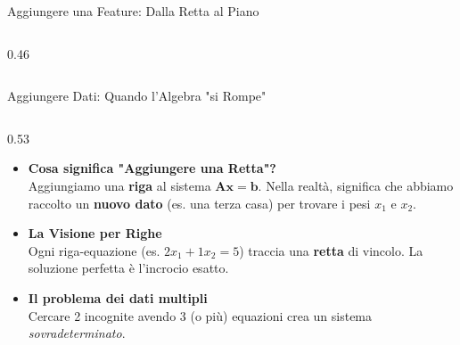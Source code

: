 \documentclass[aspectratio=169, 10pt]{beamer}
\begin{document}
\begin{frame}{Aggiungere una Feature: Dalla Retta al Piano}
\begin{columns}[T,onlytextwidth]
\begin{column}{0.46\textwidth}
        \end{column}
    \end{columns}
\end{frame}


\begin{frame}{Aggiungere Dati: Quando l'Algebra "si Rompe"}
    \begin{columns}[T,onlytextwidth]
        \setlength{\columnsep}{0.15cm}
        
        \begin{column}{0.53\textwidth}
            \vspace{-0.05cm}
            \footnotesize
            \begin{itemize}
                \setlength\itemsep{0.35em}
                \item \textbf{Cosa significa "Aggiungere una Retta"?}\\
                Aggiungiamo una \textbf{riga} al sistema $\mathbf{A}\mathbf{x}=\mathbf{b}$. Nella realtà, significa che abbiamo raccolto un \textbf{nuovo dato} (es. una terza casa) per trovare i pesi $x_1$ e $x_2$.
                
                \item \textbf{La Visione per Righe}\\
                Ogni riga-equazione (es. $2x_1 + 1x_2 = 5$) traccia una \textbf{retta} di vincolo. La soluzione perfetta è l'incrocio esatto.
                
                \item \textbf{Il problema dei dati multipli}\\
                Cercare 2 incognite avendo 3 (o più) equazioni crea un sistema \textit{sovradeterminato}.
                

\end{itemize}
\end{column}
\end{columns}
\end{frame}
\end{document}
